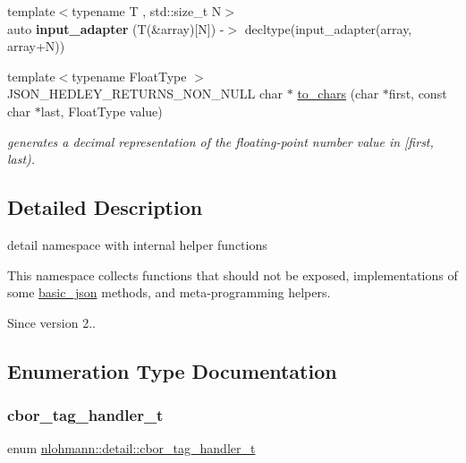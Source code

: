 \begin{DoxyCompactItemize}
\item 
\mbox{\label{namespacenlohmann_1_1detail_a7908f7aa06f20e6083619d1d4b4eb769}} 
{\footnotesize template$<$typename T , std\+::size\+\_\+t N$>$ }\\auto {\bfseries input\+\_\+adapter} (T(\&array)\mbox{[}N\mbox{]}) -\/$>$ decltype(input\+\_\+adapter(array, array+N))
\item 
{\footnotesize template$<$typename Float\+Type $>$ }\\J\+S\+O\+N\+\_\+\+H\+E\+D\+L\+E\+Y\+\_\+\+R\+E\+T\+U\+R\+N\+S\+\_\+\+N\+O\+N\+\_\+\+N\+U\+LL char $\ast$ \hyperlink{namespacenlohmann_1_1detail_a6cca370ac6c99294dbe4fe24716a57dd}{to\+\_\+chars} (char $\ast$first, const char $\ast$last, Float\+Type value)
\begin{DoxyCompactList}\small\item\em generates a decimal representation of the floating-\/point number value in \mbox{[}first, last). \end{DoxyCompactList}\end{DoxyCompactItemize}


\subsection{Detailed Description}
detail namespace with internal helper functions 

This namespace collects functions that should not be exposed, implementations of some \hyperlink{classnlohmann_1_1basic__json}{basic\+\_\+json} methods, and meta-\/programming helpers.

\begin{DoxySince}{Since}
version 2.. 
\end{DoxySince}


\subsection{Enumeration Type Documentation}
\mbox{\label{namespacenlohmann_1_1detail_a58bb1ef1a9ad287a9cfaf1855784d9ac}} 
\subsubsection{\texorpdfstring{cbor\+\_\+tag\+\_\+handler\+\_\+t}{cbor\_tag\_handler\_t}}
{\footnotesize\ttfamily enum \hyperlink{namespacenlohmann_1_1detail_a58bb1ef1a9ad287a9cfaf1855784d9ac}{nlohmann\+::detail\+::cbor\+\_\+tag\+\_\+handler\+\_\+t}\hspace{0.3cm}{\ttfamily [strong]}}



